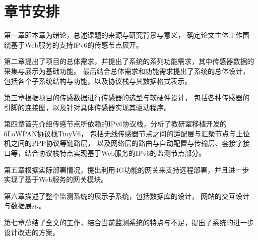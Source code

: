 \section{章节安排}

第一章即本章为绪论，总述课题的来源与研究背景与意义，
确定论文主体工作围绕基于Web服务的支持IPv6的传感节点展开。

第二章提出了项目的总体需求，并提出了系统的系列功能需求，其中传感器数据的采集与展示为基础功能。
最后结合总体需求和功能需求提出了系统的总体设计，包括各个子系统结构与功能，以及协议栈与其数据格式表示。

第三章根据项目的传感数据进行传感器的选型与软硬件设计，
包括各种传感器的引脚的连接图，以及针对具体传感器实现其驱动程序。

第四章首先介绍传感节点所依赖的IPv6协议栈，分析了教研室移植开发的6LoWPAN协议栈TinyV6，
包括无线传感器节点之间的适配层与汇聚节点与上位机之间的PPP协议等链路层，
以及网络层的路由与自动配置与传输层、套接字接口等，结合协议栈特点实现基于Web服务的IPv6的监测节点部分。

第五章根据实际部署情况，提出利用4G功能的网关来支持远程部署，并且进一步实现了基于Web服务的网关模块。

第六章描述了整个监测系统的展示子系统，包括数据库的设计， 网站的交互设计与数据展示。

第七章总结了全文的工作，结合当前监测系统的特点与不足，提出了系统的进一步设计改进的方案。
